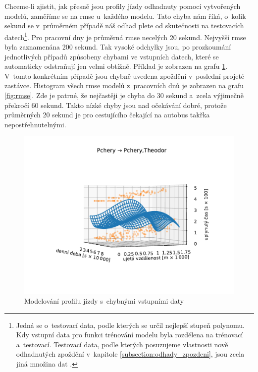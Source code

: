 \bigbreak

Chceme-li zjistit, jak přesně jsou profily jízdy odhadnuty pomocí vytvořených modelů, zaměříme se na \gls{rmse} u~každého modelu. Tato chyba nám říká, o~kolik sekund se v~průměrném případě náš odhad plete od skutečnosti na testovacích datech\footnote{Jedná se o~testovací data, podle kterých se určil nejlepší stupeň polynomu. Kdy vstupní data pro funkci trénování modelu byla rozdělena na trénovací a~testovací. Testovací data, podle kterých posuzujeme vlastnosti nově odhadnutých zpoždění v~kapitole \ref{subsection:odhady_zpozdeni}, jsou zcela jiná množina dat \citep[viz][Strana 365, validation set a~test set]{Ripley96}.}. Pro pracovní dny je průměrná \gls{rmse} necelých 20 sekund. Nejvyšší \gls{rmse} byla zaznamenána 200 sekund. Tak vysoké odchylky jsou, po prozkoumání jednotlivých případů způsobeny chybami ve vstupních datech, které se automaticky odstraňují jen velmi obtížně. Příklad je zobrazen na grafu \ref{fig:chyba_zpozdeni_v_posledni_zastavce}. V~tomto konkrétním případě jsou chybně uvedena zpoždění v~poslední projeté zastávce. Histogram všech \gls{rmse} modelů z~pracovních dnů je zobrazen na grafu \ref{fig:rmse}. Zde je patrné, že nejčastěji je chyba do 30 sekund a~zcela výjimečně překročí 60 sekund. Takto nízké chyby jsou nad očekávání dobré, protože průměrných 20 sekund je pro cestujícího čekající na autobus takřka nepostřehnutelnými.


\begin{figure}
   \centering
 \includegraphics[width=\linewidth]{../img/134_135}
 \caption{Modelování profilu jízdy s~chybnými vstupními daty}
 \label{fig:chyba_zpozdeni_v_posledni_zastavce}
\end{figure}


